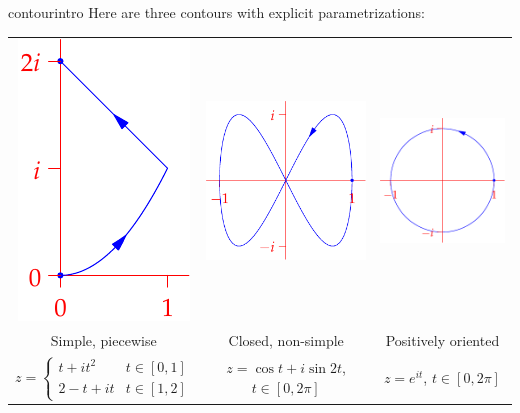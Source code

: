 \begin{examples}{}{contourintro}
	Here are three contours with explicit parametrizations:\vspace{-5pt}
	\begin{center}
		\begin{tabular}{c@{\qquad}c@{\qquad}c}
			\includegraphics[scale=0.9]{contours-ex1}
			&
			\includegraphics[scale=0.9]{contours-ex2}
			&
			\includegraphics[scale=0.9]{contours-ex3}
			\\
			Simple, piecewise
			&
			Closed, non-simple
			&
			Positively oriented
			\\[2pt]
			$z=\begin{cases}
			t+it^2&t\in[0,1]\\
			2-t+it&t\in[1,2]
			\end{cases}$
			&
			$z=\cos t+i\sin 2t$, $t\in[0,2\pi]$
			&
			$z=e^{it}$, $t\in[0,2\pi]$
		\end{tabular}
	\end{center}
\end{examples}

